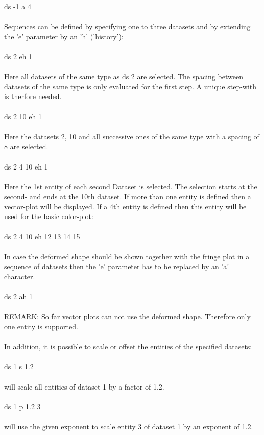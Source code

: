 \documentclass{article}
\begin{document}
ds -1 a 4\\\\
Sequences can be defined by specifying one to three datasets and by extending the 'e' parameter by an 'h' ('history'):\\\\
ds 2 eh 1\\\\
Here all datasets of the same type as ds 2 are selected. The spacing between datasets of the same type is only evaluated for the first step. A unique step-with is therfore needed.\\\\
ds 2 10 eh 1\\\\
Here the datasets 2, 10 and all successive ones of the same type with a spacing of 8 are selected.\\\\
ds 2 4 10 eh 1\\\\
Here the 1st entity of each second Dataset is selected. The selection starts at the second- and ends at the 10th dataset. If more than one entity is defined then a vector-plot will be displayed. If a 4th entity is defined then this entity will be used for the basic color-plot:\\\\
ds 2 4 10 eh 12 13 14 15\\\\
In case the deformed shape should be shown together with the fringe plot in a sequence of datasets then the 'e' parameter has to be replaced by an 'a' character.\\\\
ds 2 ah 1\\\\ REMARK: So far vector plots can not use the deformed shape. Therefore only one entity is supported.\\\\
In addition, it is possible to scale or offset the entities of the specified datasets:\\\\
ds 1 s 1.2\\\\
will scale all entities of dataset 1 by a factor of 1.2.\\\\
ds 1 p 1.2 3\\\\
will use the given exponent to scale entity 3 of dataset 1 by an exponent of 1.2.\\\\
\end{document}
